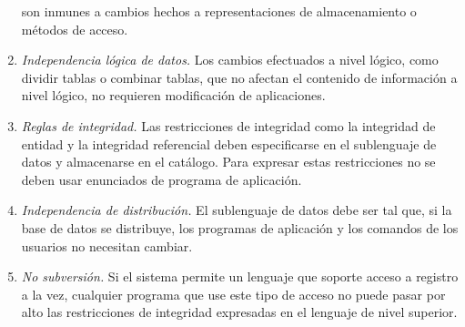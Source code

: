 \documentclass[12pt]{report}
\begin{document}
\begin{enumerate}[label=\textbf{Regla \arabic*.},start=0]
					son inmunes a cambios hechos a representaciones de almacenamiento o 
					métodos de acceso.
				\item \textit{Independencia lógica de datos.} Los cambios efectuados 
					a nivel lógico, como dividir tablas o combinar tablas, que no afectan 
					el contenido de información a nivel lógico, no requieren modificación 
					de aplicaciones.
				\item \textit{Reglas de integridad.} Las restricciones de integridad 
					como la integridad de entidad y la integridad referencial deben 
					especificarse en el sublenguaje de datos y almacenarse en el 
					catálogo. Para expresar estas restricciones no se deben usar enunciados 
					de programa de aplicación.
				\item \textit{Independencia de distribución.} El sublenguaje de datos 
					debe ser tal que, si la base de datos se distribuye, los programas de 
					aplicación y los comandos de los usuarios no necesitan cambiar.
				\item \textit{No subversión.} Si el sistema permite un lenguaje 
					que soporte acceso a registro a la vez, cualquier programa que use 
					este tipo de acceso no puede pasar por alto las restricciones de 
					integridad expresadas en el lenguaje de nivel superior.
			\end{enumerate}
\end{document}
